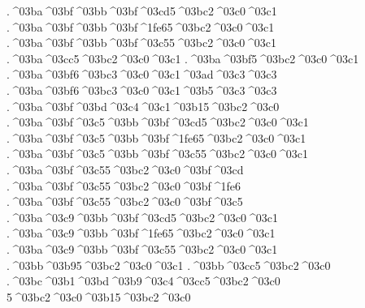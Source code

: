 {.^^^^03ba^^^^03bf^^^^03bb^^^^03bf^^^^03cd5^^^^03bc2^^^^03c0^^^^03c1 %
.^^^^03ba^^^^03bf^^^^03bb^^^^03bf^^^^1fe65^^^^03bc2^^^^03c0^^^^03c1
.^^^^03ba^^^^03bf^^^^03bb^^^^03bf^^^^03c55^^^^03bc2^^^^03c0^^^^03c1
.^^^^03ba^^^^03cc5^^^^03bc2^^^^03c0^^^^03c1    %
.^^^^03ba^^^^03bf5^^^^03bc2^^^^03c0^^^^03c1
  .^^^^03ba^^^^03bf6^^^^03bc3^^^^03c0^^^^03c1^^^^03ad^^^^03c3^^^^03c3 %
  .^^^^03ba^^^^03bf6^^^^03bc3^^^^03c0^^^^03c1^^^^03b5^^^^03c3^^^^03c3
.^^^^03ba^^^^03bf^^^^03bd^^^^03c4^^^^03c1^^^^03b15^^^^03bc2^^^^03c0  %
.^^^^03ba^^^^03bf^^^^03c5^^^^03bb^^^^03bf^^^^03cd5^^^^03bc2^^^^03c0^^^^03c1 %
.^^^^03ba^^^^03bf^^^^03c5^^^^03bb^^^^03bf^^^^1fe65^^^^03bc2^^^^03c0^^^^03c1
.^^^^03ba^^^^03bf^^^^03c5^^^^03bb^^^^03bf^^^^03c55^^^^03bc2^^^^03c0^^^^03c1
.^^^^03ba^^^^03bf^^^^03c55^^^^03bc2^^^^03c0^^^^03bf^^^^03cd  %
.^^^^03ba^^^^03bf^^^^03c55^^^^03bc2^^^^03c0^^^^03bf^^^^1fe6
.^^^^03ba^^^^03bf^^^^03c55^^^^03bc2^^^^03c0^^^^03bf^^^^03c5
.^^^^03ba^^^^03c9^^^^03bb^^^^03bf^^^^03cd5^^^^03bc2^^^^03c0^^^^03c1 %
.^^^^03ba^^^^03c9^^^^03bb^^^^03bf^^^^1fe65^^^^03bc2^^^^03c0^^^^03c1
.^^^^03ba^^^^03c9^^^^03bb^^^^03bf^^^^03c55^^^^03bc2^^^^03c0^^^^03c1
.^^^^03bb^^^^03b95^^^^03bc2^^^^03c0^^^^03c1     %
.^^^^03bb^^^^03cc5^^^^03bc2^^^^03c0     %
.^^^^03bc^^^^03b1^^^^03bd^^^^03b9^^^^03c4^^^^03cc5^^^^03bc2^^^^03c0 %
5^^^^03bc2^^^^03c0^^^^03b15^^^^03bc2^^^^03c0    %
}

